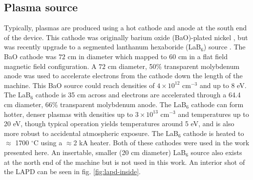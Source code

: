 \subsection{Plasma source}

Typically, plasmas are produced using a hot cathode and anode at the south end of the device. This cathode was originally barium oxide (BaO)-plated nickel \cite{gekelman_upgraded_2016}, but was recently upgrade to a segmented lanthanum hexaboride (LaB$_6$) source \cite{qian_design_2023}. The BaO cathode was $72$ cm in diameter which mapped to 60 cm in a flat field magnetic field configuration. A $72$ cm diameter, 50\% transparent molybdenum anode was used to accelerate electrons from the cathode down the length of the machine. This BaO source could reach densities of $4 \times 10^{12}$ cm$^{-3}$ and up to 8 eV. The LaB$_6$ cathode is 35 cm across and electrons are accelerated through a 64.4 cm diameter, 66\% transparent molybdenum anode. The LaB$_6$ cathode can form hotter, denser plasmas with densities up to $3 \times 10^{13}$ cm$^{-3}$ and temperatures up to 20 eV, though typical operation yields temperatures around 5 eV, and is also more robust to accidental atmospheric exposure. The LaB$_6$ cathode is heated to $\approx$ 1700 $^\circ$C using a $\approx$2 kA heater. Both of these cathodes were used in the work presented here. An insertable, smaller (20 cm diameter) LaB$_6$ source also exists at the north end of the machine but is not used in this work. An interior shot of the LAPD can be seen in fig. \ref{fig:lapd-inside}.

